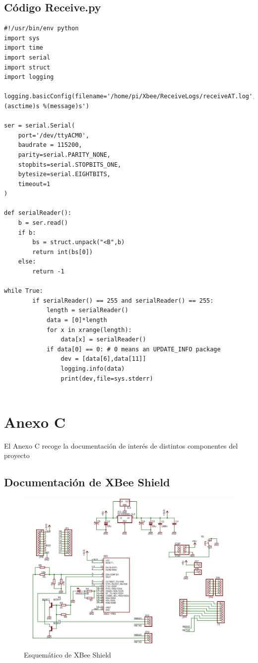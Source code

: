 \section{Código Receive.py}\label{anexo:receive}

\begin{lstlisting}[frame=leftline, caption={Receive.py}, label=code:Receive]
#!/usr/bin/env python
import sys
import time
import serial
import struct
import logging

logging.basicConfig(filename='/home/pi/Xbee/ReceiveLogs/receiveAT.log',level=logging.DEBUG,format='%(asctime)s %(message)s')

ser = serial.Serial(
	port='/dev/ttyACM0',
	baudrate = 115200,
	parity=serial.PARITY_NONE,
	stopbits=serial.STOPBITS_ONE,
	bytesize=serial.EIGHTBITS,
	timeout=1
)

def serialReader():
    b = ser.read()
    if b:
        bs = struct.unpack("<B",b)
        return int(bs[0])
    else:
        return -1

while True:
        if serialReader() == 255 and serialReader() == 255:
            length = serialReader()
            data = [0]*length
            for x in xrange(length):
                data[x] = serialReader()
            if data[0] == 0: # 0 means an UPDATE_INFO package
                dev = [data[6],data[11]]
                logging.info(data)
                print(dev,file=sys.stderr)
                
\end{lstlisting}

\chapter{Anexo C}

El Anexo C recoge la documentación de interés de distintos componentes del proyecto

\section{Documentación de XBee Shield}

\begin{figure}[H]
\centering
\includegraphics[width=1\textwidth]{figuras/XbeeShSch.png}
\caption{Esquemático de XBee Shield}
\label{fig:esquemaXBShield}
\end{figure}